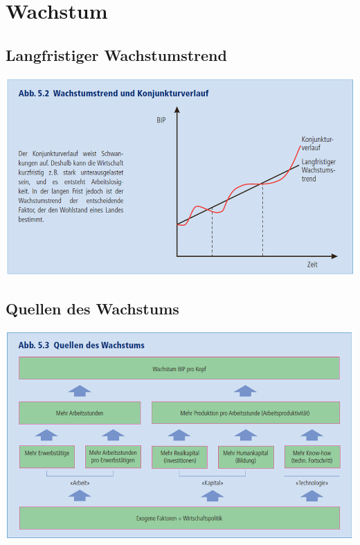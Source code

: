 \section{Wachstum}
\subsection{Langfristiger Wachstumstrend}
\includegraphics[width=0.65\linewidth]{images/wachstum.png}
\subsection{Quellen des Wachstums}
\includegraphics[width=0.65\linewidth]{images/quellen.png}
